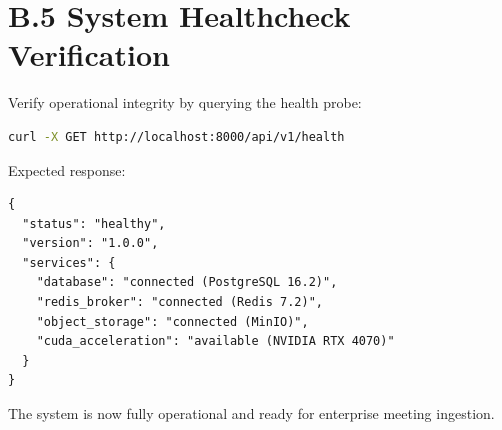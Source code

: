 \documentclass[12pt,a4paper,oneside]{report}
\begin{document}
\section*{B.5 System Healthcheck Verification}
Verify operational integrity by querying the health probe:
\begin{lstlisting}[language=bash, caption={API Health Verification Probe}]
curl -X GET http://localhost:8000/api/v1/health
\end{lstlisting}
Expected response:
\begin{lstlisting}[caption={Expected JSON Healthcheck Response}]
{
  "status": "healthy",
  "version": "1.0.0",
  "services": {
    "database": "connected (PostgreSQL 16.2)",
    "redis_broker": "connected (Redis 7.2)",
    "object_storage": "connected (MinIO)",
    "cuda_acceleration": "available (NVIDIA RTX 4070)"
  }
}
\end{lstlisting}
The system is now fully operational and ready for enterprise meeting ingestion.
\end{document}
